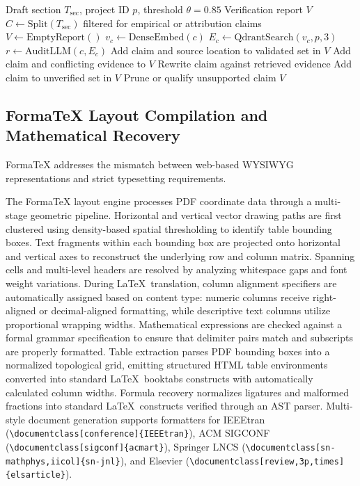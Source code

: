 \documentclass[conference]{IEEEtran}
\begin{document}
\begin{algorithm}[!t]
\caption{Real-Time Claim Extraction and Multi-Hop Grounding}
\label{alg:fact}
\begin{algorithmic}[1]
\Require Draft section $T_{\mathrm{sec}}$, project ID $p$, threshold $\theta = 0.85$
\Ensure Verification report $V$
\State $C \gets \mathrm{Split}(T_{\mathrm{sec}})$ filtered for empirical or attribution claims
\State $V \gets \mathrm{EmptyReport}()$
  \State $v_c \gets \mathrm{DenseEmbed}(c)$
  \State $E_c \gets \mathrm{QdrantSearch}(v_c, p, 3)$
  \State $r \gets \mathrm{AuditLLM}(c, E_c)$
    \State Add claim and source location to validated set in $V$
    \State Add claim and conflicting evidence to $V$
    \State Rewrite claim against retrieved evidence
  \Else
    \State Add claim to unverified set in $V$
    \State Prune or qualify unsupported claim
  \EndIf
\EndFor
\State \Return $V$
\end{algorithmic}
\end{algorithm}

\subsection{FormaTeX Layout Compilation and Mathematical Recovery}
FormaTeX addresses the mismatch between web-based WYSIWYG representations and strict typesetting requirements.

The FormaTeX layout engine processes PDF coordinate data through a multi-stage geometric pipeline. Horizontal and vertical vector drawing paths are first clustered using density-based spatial thresholding to identify table bounding boxes. Text fragments within each bounding box are projected onto horizontal and vertical axes to reconstruct the underlying row and column matrix. Spanning cells and multi-level headers are resolved by analyzing whitespace gaps and font weight variations. During \LaTeX\ translation, column alignment specifiers are automatically assigned based on content type: numeric columns receive right-aligned or decimal-aligned formatting, while descriptive text columns utilize proportional wrapping widths. Mathematical expressions are checked against a formal grammar specification to ensure that delimiter pairs match and subscripts are properly formatted. Table extraction parses PDF bounding boxes into a normalized topological grid, emitting structured HTML table environments converted into standard \LaTeX\ booktabs constructs with automatically calculated column widths. Formula recovery normalizes ligatures and malformed fractions into standard \LaTeX\ constructs verified through an AST parser. Multi-style document generation supports formatters for IEEEtran (\verb|\documentclass[conference]{IEEEtran}|), ACM SIGCONF (\verb|\documentclass[sigconf]{acmart}|), Springer LNCS (\verb|\documentclass[sn-mathphys,iicol]{sn-jnl}|), and Elsevier (\verb|\documentclass[review,3p,times]{elsarticle}|).
\end{document}
